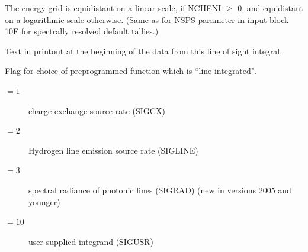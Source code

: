 \begin{description}
        The energy grid is equidistant on a linear scale, if NCHENI $\ge$ 0, and
        equidistant on a logarithmic scale otherwise.
        (Same as for NSPS parameter in input block 10F for spectrally resolved default
        tallies.)
  \item[TXTSIG] Text in printout at the beginning of the data from this line of
        sight integral.
  \item[NSPTAL] Flag for choice of preprogrammed function which is ``line
        integrated".
        \begin{description}
          \item[$= 1$] charge-exchange source rate (SIGCX)
          \item[$= 2$] Hydrogen line
                emission source rate (SIGLINE)
          \item[$= 3$] spectral radiance of photonic lines
                (SIGRAD) (new in versions 2005 and younger)
          \item[$= 10$] user supplied
                integrand (SIGUSR)


\end{description}
\end{description}
